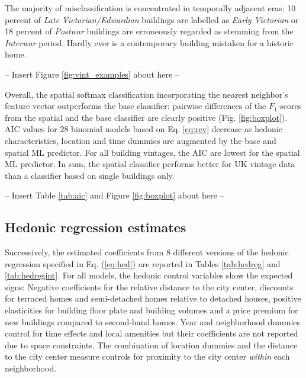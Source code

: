 \documentclass[]{article}
\begin{document}
The majority of misclassification is concentrated in temporally adjacent
eras: 10 percent of \emph{Late Victorian/Edwardian} buildings are
labelled as \emph{Early Victorian} or 18 percent of \emph{Postwar}
buildings are erroneously regarded as stemming from the \emph{Interwar}
period. Hardly ever is a contemporary building mistaken for a historic
home.

\begin{center}
  -- Insert Figure \ref{fig:vint_examples} about here --
\end{center}

Overall, the spatial softmax classification incorporating the nearest
neighbor's feature vector outperforms the base classifier: pairwise
differences of the \(F_1\)-scores from the spatial and the base
classifier are clearly positive (Fig. \ref{fig:boxplot}). AIC values for
28 binomial models based on Eq. \ref{eq:rev} decrease as hedonic
characteristics, location and time dummies are augmented by the base and
spatial ML predictor. For all building vintages, the AIC are lowest for
the spatial ML predictor. In sum, the spatial classifier performs better
for UK vintage data than a classifier based on single buildings only.

\begin{center}
  -- Insert Table \ref{tab:aic} and Figure \ref{fig:boxplot} about here --
\end{center}

\hypertarget{hedonic-regression-estimates}{%
\subsection{Hedonic regression
estimates}\label{hedonic-regression-estimates}}

Successively, the estimated coefficients from 8 different versions of
the hedonic regression specified in Eq. (\ref{eq:hed}) are reported in
Tables \ref{tab:hedreg} and \ref{tab:hedregint}. For all models, the
hedonic control variables show the expected signs: Negative coefficients
for the relative distance to the city center, discounts for terraced
homes and semi-detached homes relative to detached houses, positive
elasticities for building floor plate and building volumes and a price
premium for new buildings compared to second-hand homes. Year and
neighborhood dummies control for time effects and local amenities but
their coefficients are not reported due to space constraints. The
combination of location dummies and the distance to the city center
measure controls for proximity to the city center \emph{within} each
neighborhood.
\end{document}
